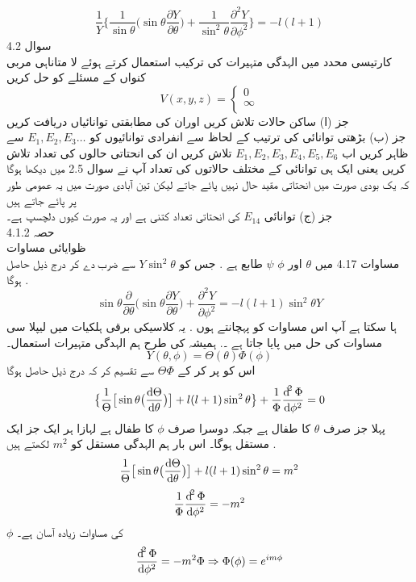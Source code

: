 \documentclass{book}
\begin{document}
\[\frac{1}{Y}\big\{\frac{1}{\sin{\theta}}\big(\sin{\theta}\frac{\partial{Y}}{\partial{\theta}}\big)+\frac{1}{\sin^{2}{\theta}}\frac{\partial^{2}{Y}}{\partial{\phi^{2}}}\big\}=-l(l+1)\]
سوال 
4.2\\
کارتیسی محدد میں الہدگی متہیرات کی ترکیب استعمال کرتے ہوئے لا متاناہی مربی کنواں کے مسئلے کو حل کریں
\[V(x,y,z)=\begin{cases}
0\\
\infty\\
\end{cases}\]
جز (ا) ساکن حالات تلاش کریں اوران کی مطابقتی توانائیاں دریافت کریں \\
جز (ب) 
بڑھتی توانائی کی ترتیب کے لحاظ سے انفرادی توانائیوں کو 
\(E_{1}, E_{2}, E_{3}\dotsc\)
سے ظاہر کریں 
اب 
\(E_{1},E_{2},E_{3},E_{4},E_{5}, E_{6}\)
تلاش کریں 
ان کی انحتاتی حالوں کی تعداد تلاش کریں 
یعنی ایک ہی توانائی کے مختلف حالاتوں کی تعداد 
آپ نے سوال 2.5 میں دیکھا ہوگا کہ یک بودی صورت میں انحتاتی مقید حال نہیں پائے جاتے لیکن تین آبادی صورت میں یہ عمومی طور پر پائے جاتے ہیں \\
جز (ج) توانائی
 \(E_{14}\)
  کی انحتاتی تعداد کتنی ہے اور یہ صورت کیوں دلچسپ ہے۔ \\
حصہ 4.1.2 \\
ظوایائی مساوات \\
مساوات 4.17 میں
 \(\theta\)
  اور
   \(\phi\)
  \(\psi\)
     طابع ہے .
جس کو
 \(Y\sin^{2}{\theta}\)
  سے ضرب دے کر درج ذیل حاصل ہوگا .\\
\[\sin{\theta}\frac{\partial}{\partial{\theta}}\big(\sin{\theta}\frac{\partial{Y}}{\partial{\theta}}\big)+\frac{\partial^{2}{Y}}{\partial{\phi^{2}}}=-l(l+1)\sin^{2}{\theta Y}\]
ہا سکتا ہے آپ اس مساوات کو پہچانتے ہوں .
یہ کلاسیکی برقی ہلکیات میں لیپلا سی مساوات کی حل میں پایا جاتا ہے ۔.
ہمیشہ کی طرح ہم الہدگی متہیرات استعمال۔
\[Y(\theta,\phi)=\Theta(\theta)\Phi(\phi)\]
اس کو پر کر کے 
\(\Theta\Phi\)
سے تقسیم کر کہ درج ذیل حاصل ہوگا 
\[\big\{\frac{1}{\Theta}\big[\sin{\theta}\big(\frac{\dif{\Theta}}{\dif{\theta}}\big)\big]+l(l+1)\sin^{2}{\theta}\big\}+\frac{1}{\Phi}\frac{\dif^{2}{\Phi}}{\dif{\phi^{2}}}=0\]
پہلا جز صرف
 \(\theta\)
  کا طفال ہے جبکہ دوسرا صرف
  \(\phi\)
    کا طفال ہے لہازا ہر ایک جز ایک مستقل ہوگا۔
اس بار ہم الہدگی مستقل کو
 \(m^{2}\)
  لکھتے ہیں .
\[\frac{1}{\Theta}\big[\sin{\theta}\big(\frac{\dif{\Theta}}{\dif{\theta}}\big)\big]+l(l+1)\sin^{2}{\theta}=m^{2}\]
\[\frac{1}{\Phi}\frac{\dif^{2}{\Phi}}{\dif{\phi^{2}}}=-m^{2}\]
 \(\phi\)
 کی مساوات زیادہ آسان ہے۔\\
 \[\frac{\dif^{2}{\Phi}}{\dif{\phi^{2}}}=-m^{2}\Phi\Rightarrow\Phi(\phi)=e^{im\phi}\]
\end{document}
